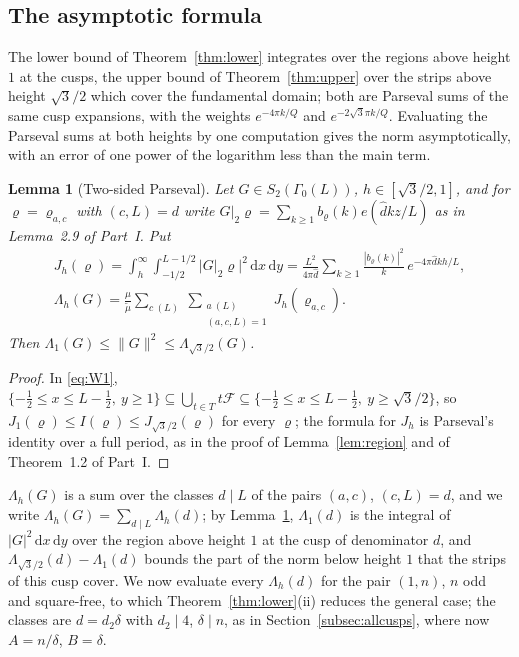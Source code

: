 ﻿\documentclass[11pt]{amsart}
\newtheorem{lemma}[theorem]{Lemma}
\theoremstyle{remark}
\newcommand{\cF}{\mathcal{F}}
\newcommand{\dd}{\mathrm{d}}
\begin{document}
\subsection{The asymptotic formula}\label{subsec:asymp}
The lower bound of Theorem~\ref{thm:lower} integrates over the regions above height $1$ at the cusps, the upper bound of Theorem~\ref{thm:upper} over the strips above height $\sqrt3/2$ which cover the fundamental domain; both are Parseval sums of the same cusp expansions, with the weights $e^{-4\pi k/Q}$ and $e^{-2\sqrt3\pi k/Q}$. Evaluating the Parseval sums at both heights by one computation gives the norm asymptotically, with an error of one power of the logarithm less than the main term.

\begin{lemma}[Two-sided Parseval]\label{lem:sandwich}
Let $G\in S_2(\Gamma_0(L))$, $h\in[\sqrt3/2,1]$, and for $\varrho=\varrho_{a,c}$ with $(c,L)=d$ write $G|_2\varrho=\sum_{k\ge1}b_\varrho(k)e(\hat dkz/L)$ as in Lemma~2.9 of Part~I. Put
\begin{gather*}
J_h(\varrho)=\int_h^\infty\!\!\int_{-1/2}^{L-1/2}|G|_2\varrho|^2\,\dd x\,\dd y=\frac{L^2}{4\pi\hat d}\sum_{k\ge1}\frac{|b_\varrho(k)|^2}{k}\,e^{-4\pi\hat dkh/L},\\
\Lambda_h(G)=\frac\mu{\tilde\mu}\sum_{c\ (L)}\ \sum_{\substack{a\ (L)\\(a,c,L)=1}}J_h(\varrho_{a,c}).
\end{gather*}
Then $\Lambda_1(G)\le\|G\|^2\le\Lambda_{\sqrt3/2}(G)$.
\end{lemma}
\begin{proof}
In \eqref{eq:W1}, $\{-\frac12\le x\le L-\frac12,\ y\ge1\}\subseteq\bigcup_{t\in T}t\cF\subseteq\{-\frac12\le x\le L-\frac12,\ y\ge\sqrt3/2\}$, so $J_1(\varrho)\le I(\varrho)\le J_{\sqrt3/2}(\varrho)$ for every $\varrho$; the formula for $J_h$ is Parseval's identity over a full period, as in the proof of Lemma~\ref{lem:region} and of Theorem~1.2 of Part~I.
\end{proof}

$\Lambda_h(G)$ is a sum over the classes $d\mid L$ of the pairs $(a,c)$, $(c,L)=d$, and we write $\Lambda_h(G)=\sum_{d\mid L}\Lambda_h(d)$; by Lemma~\ref{lem:sandwich}, $\Lambda_1(d)$ is the integral of $|G|^2\,\dd x\,\dd y$ over the region above height $1$ at the cusp of denominator $d$, and $\Lambda_{\sqrt3/2}(d)-\Lambda_1(d)$ bounds the part of the norm below height $1$ that the strips of this cusp cover. We now evaluate every $\Lambda_h(d)$ for the pair $(1,n)$, $n$ odd and square-free, to which Theorem~\ref{thm:lower}(ii) reduces the general case; the classes are $d=d_2\delta$ with $d_2\mid4$, $\delta\mid n$, as in Section~\ref{subsec:allcusps}, where now $A=n/\delta$, $B=\delta$.
\end{document}
